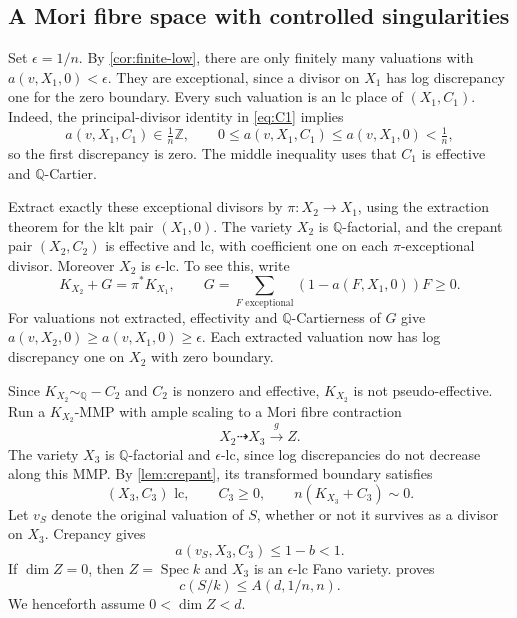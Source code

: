 \documentclass[11pt]{article}
\numberwithin{equation}{section}
\theoremstyle{definition}
\newcommand{\Q}{\mathbb Q}
\newcommand{\Z}{\mathbb Z}
\newcommand{\Spec}{\operatorname{Spec}}
\newcommand{\bir}{\dashrightarrow}
\newcommand{\simq}{\sim_{\Q}}
\newcommand{\cdeg}[2]{c(#1/#2)}
\begin{document}
\subsection{A Mori fibre space with controlled singularities}

Set $\epsilon=1/n$. By \cref{cor:finite-low}, there are only finitely
many valuations with $a(v,X_1,0)<\epsilon$. They are exceptional,
since a divisor on $X_1$ has log discrepancy one for the zero boundary.
Every such valuation is an lc place of $(X_1,C_1)$. Indeed, the
principal-divisor identity in \eqref{eq:C1} implies
\[
 a(v,X_1,C_1)\in\tfrac1n\Z,
 \qquad 0\leq a(v,X_1,C_1)\leq a(v,X_1,0)<\tfrac1n,
\]
so the first discrepancy is zero. The middle inequality uses that
$C_1$ is effective and $\Q$-Cartier.

Extract exactly these exceptional divisors by
$\pi:X_2\to X_1$, using the extraction theorem for the klt pair
$(X_1,0)$. The variety $X_2$ is $\Q$-factorial, and the crepant pair
$(X_2,C_2)$ is effective and lc, with coefficient one on each
$\pi$-exceptional divisor. Moreover $X_2$ is $\epsilon$-lc. To see
this, write
\[
 K_{X_2}+G=\pi^*K_{X_1},
 \qquad
 G=\sum_{F\text{ exceptional}}(1-a(F,X_1,0))F\geq0.
\]
For valuations not extracted, effectivity and $\Q$-Cartierness of
$G$ give $a(v,X_2,0)\geq a(v,X_1,0)\geq\epsilon$. Each extracted
valuation now has log discrepancy one on $X_2$ with zero boundary.

Since $K_{X_2}\simq-C_2$ and $C_2$ is nonzero and effective,
$K_{X_2}$ is not pseudo-effective. Run a $K_{X_2}$-MMP with ample
scaling to a Mori fibre contraction
\begin{equation}\label{eq:second-mori}
 X_2\bir X_3\xrightarrow{g}Z.
\end{equation}
The variety $X_3$ is $\Q$-factorial and $\epsilon$-lc, since log
discrepancies do not decrease along this MMP. By
\cref{lem:crepant}, its transformed boundary satisfies
\[
 (X_3,C_3)\text{ lc},\qquad C_3\geq0,
 \qquad n(K_{X_3}+C_3)\sim0.
\]
Let $v_S$ denote the original valuation of $S$, whether or not it
survives as a divisor on $X_3$. Crepancy gives
\begin{equation}\label{eq:Sdiscrepancy}
 a(v_S,X_3,C_3)\leq1-b<1.
\end{equation}
If $\dim Z=0$, then $Z=\Spec k$ and $X_3$ is an $\epsilon$-lc Fano
variety.  proves
\begin{equation}\label{eq:bounded-fano-case}
 \cdeg{S}{k}\leq A(d,1/n,n).
\end{equation}
We henceforth assume $0<\dim Z<d$.
\end{document}
